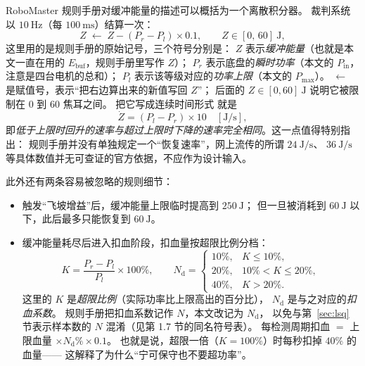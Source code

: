 \documentclass[cn,blue,11pt,device=normal]{elegantnote}
\newcommand{\Pin}{P_{\mathrm{in}}{}}
\newcommand{\Ebuf}{E_{\mathrm{buf}}{}}
\newcommand{\Pmax}{P_{\max}{}}
\begin{document}
RoboMaster 规则手册对缓冲能量的描述可以概括为一个离散积分器。
裁判系统以 $10\ \mathrm{Hz}$（每 $100\ \mathrm{ms}$）结算一次：
\begin{equation}\label{eq:officialbuffer}
  Z \;\leftarrow\; Z - (P_r - P_l)\times 0.1,
  \qquad Z\in[0,\,60]\ \mathrm{J},
\end{equation}
这里用的是规则手册的原始记号，三个符号分别是：
$Z$ 表示\emph{缓冲能量}（也就是本文一直在用的 $\Ebuf$，规则手册里写作 $Z$）；
$P_r$ 表示底盘的\emph{瞬时功率}（本文的 $\Pin$，注意是四台电机的总和）；
$P_l$ 表示该等级对应的\emph{功率上限}（本文的 $\Pmax$）。
$\leftarrow$ 是赋值号，表示“把右边算出来的新值写回 $Z$”；
后面的 $Z\in[0,60]\ \mathrm{J}$ 说明它被限制在 $0$ 到 $60$ 焦耳之间。
把它写成连续时间形式\cite{rm2024rules} 就是
\begin{equation}
  \dot Z = (P_l - P_r)\times 10 \quad [\mathrm{J/s}],
\end{equation}
即\emph{低于上限时回升的速率与超过上限时下降的速率完全相同}。这一点值得特别指出：
规则手册并没有单独规定一个“恢复速率”，网上流传的所谓 $24\ \mathrm{J/s}$、
$36\ \mathrm{J/s}$ 等具体数值并无可查证的官方依据，不应作为设计输入。

此外还有两条容易被忽略的规则细节：
\begin{itemize}
  \item 触发“飞坡增益”后，缓冲能量上限临时提高到 $250\ \mathrm{J}$；
  但一旦被消耗到 $60\ \mathrm{J}$ 以下，此后最多只能恢复到 $60\ \mathrm{J}$。
  \item 缓冲能量耗尽后进入扣血阶段，扣血量按超限比例分档：
  \begin{equation}
    K = \frac{P_r - P_l}{P_l}\times100\%,
    \qquad
    N_{\mathrm{d}} = \begin{cases}
      10\%, & K \le 10\%,\\
      20\%, & 10\% < K \le 20\%,\\
      40\%, & K > 20\%.
    \end{cases}
  \end{equation}
  这里的 $K$ 是\emph{超限比例}（实际功率比上限高出的百分比），
  $N_{\mathrm{d}}$ 是与之对应的\emph{扣血系数}。
  规则手册把扣血系数记作 $N$，本文改记为 $N_{\mathrm{d}}$，
  以免与第~\ref{sec:lsq} 节表示样本数的 $N$ 混淆（见第 1.7 节的同名符号表）。
  每检测周期扣血 $=$ 上限血量 $\times N_{\mathrm{d}}\% \times 0.1$。
  也就是说，超限一倍（$K=100\%$）时每秒扣掉 $40\%$ 的血量——
  这解释了为什么“宁可保守也不要超功率”。
\end{itemize}
\end{document}
